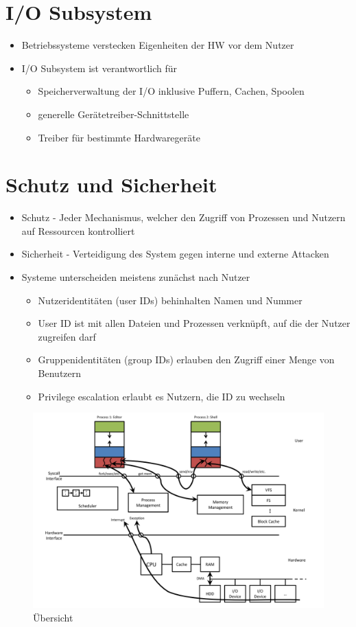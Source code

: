 \documentclass[a4paper]{scrreprt}
\begin{document}
\section{I/O Subsystem}
\begin{itemize}
	\item Betriebssysteme verstecken Eigenheiten der HW vor dem Nutzer
	\item I/O Subsystem ist verantwortlich für
		\begin{itemize}
			\item Speicherverwaltung der I/O inklusive Puffern, Cachen, Spoolen
			\item generelle Gerätetreiber-Schnittstelle
			\item Treiber für bestimmte Hardwaregeräte
		\end{itemize}
\end{itemize}

\section{Schutz und Sicherheit}
\begin{itemize}
	\item Schutz - Jeder Mechanismus, welcher den Zugriff von Prozessen und Nutzern auf Ressourcen kontrolliert
	\item Sicherheit - Verteidigung des System gegen interne und externe Attacken
	\item Systeme unterscheiden meistens zunächst nach Nutzer
		\begin{itemize}
			\item Nutzeridentitäten (user IDs) behinhalten Namen und Nummer
			\item User ID ist mit allen Dateien und Prozessen verknüpft, auf die der Nutzer zugreifen darf
			\item Gruppenidentitäten (group IDs) erlauben den Zugriff einer Menge von Benutzern
			\item Privilege escalation erlaubt es Nutzern, die ID zu wechseln
		\end{itemize}
\end{itemize}

\begin{figure}[ht]
\centering
\includegraphics[scale=0.5]{graphics/big_picture.png}
\caption{Übersicht}
\end{figure}
\end{document}
